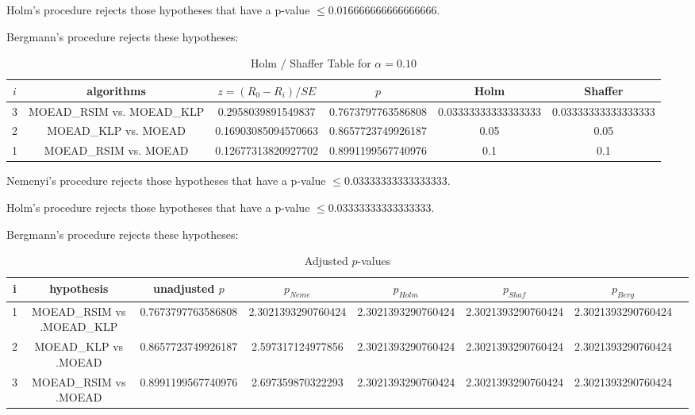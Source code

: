 \documentclass[a4paper,10pt]{article}
\begin{document}
\begin{landscape}
Holm's procedure rejects those hypotheses that have a p-value $\le0.016666666666666666$.


Bergmann's procedure rejects these hypotheses:


\begin{itemize}


\end{itemize}


\begin{table}[!htp]
\centering\tiny
\caption{Holm / Shaffer Table for $\alpha=0.10$}
\begin{tabular}{cccccc}
$i$&algorithms&$z=(R_0 - R_i)/SE$&$p$&Holm&Shaffer\\
\hline
3&MOEAD_RSIM vs. MOEAD_KLP&0.2958039891549837&0.7673797763586808&0.03333333333333333&0.03333333333333333\\
2&MOEAD_KLP vs. MOEAD&0.16903085094570663&0.8657723749926187&0.05&0.05\\
1&MOEAD_RSIM vs. MOEAD&0.12677313820927702&0.8991199567740976&0.1&0.1\\
\hline
\end{tabular}
\end{table}
Nemenyi's procedure rejects those hypotheses that have a p-value $\le0.03333333333333333$.


Holm's procedure rejects those hypotheses that have a p-value $\le0.03333333333333333$.


Bergmann's procedure rejects these hypotheses:


\begin{itemize}


\end{itemize}


\begin{table}[!htp]
\centering\tiny
\caption{Adjusted $p$-values}
\begin{tabular}{cccccccc}
i&hypothesis&unadjusted $p$&$p_{Neme}$&$p_{Holm}$&$p_{Shaf}$&$p_{Berg}$\\
\hline
1&MOEAD_RSIM vs .MOEAD_KLP&0.7673797763586808&2.3021393290760424&2.3021393290760424&2.3021393290760424&2.3021393290760424\\
2&MOEAD_KLP vs .MOEAD&0.8657723749926187&2.597317124977856&2.3021393290760424&2.3021393290760424&2.3021393290760424\\
3&MOEAD_RSIM vs .MOEAD&0.8991199567740976&2.697359870322293&2.3021393290760424&2.3021393290760424&2.3021393290760424\\
\hline
\end{tabular}
\end{table}

\end{landscape}
\end{document}
